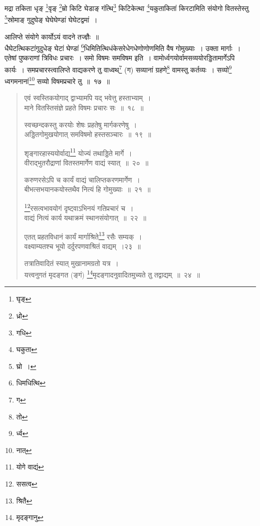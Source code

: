 \documentclass[11pt, openany]{book}
\begin{document}
{\qt मद्रा तकिता धृङ् \renewcommand{\thefootnote}{21}\footnote{घृङ्}वृङ् \renewcommand{\thefootnote}{22}\footnote{ध्रो}म्रो किटि घेडाङ् गंत्थि\renewcommand{\thefootnote}{23}\footnote{गधि} किटिकेत्था \renewcommand{\thefootnote}{24}\footnote{घकुता}यकुताकितां किरटामिति संयोगो वितस्तेस्तु \renewcommand{\thefootnote}{25}\footnote{घ्रो~।}स्रोमाङ् गुदुघेङ् घेघेघेण्डां घेघेटद्वमां~।}

\newpage

{\qt आलिप्ते संयोगे कार्योऽयं वादने तज्ज्ञैः~॥}\\

{\qt धैघेटत्थिकटांगुदुधेङ् घेटां घेण्डां \renewcommand{\thefootnote}{1}\footnote{धिमधित्थि}धिमितित्थिधंकेसरेधेगधेणोणोणमिति वैष गोमुख्याः~। उक्ता मार्गाः~।}\\

{\qt एतेषां पुष्कराणां त्रिविधः प्रचारः~। समो विषमः समविषम इति~। वामोर्ध्वगयोर्वामसव्ययोरड्डितामार्गेऽपि कार्यः~। समप्रचारस्त्वालिप्ते वाद्यकरणे तु वाध्वथ्\renewcommand{\thefootnote}{2}\footnote{ग} (ग) सव्यानां ग्रहणे\renewcommand{\thefootnote}{3}\footnote{तो} वामस्तु कर्तव्यः~। सव्यो\renewcommand{\thefootnote}{4}\footnote{र्ध्व} ध्वगमनानां\renewcommand{\thefootnote}{5}\footnote{नात्} सव्यो विषमप्रचारे तु~॥~१७~॥}

\begin{quote}
{\na  एवं स्वस्तिकयोगाद् द्वाभ्यामपि यद् भवेत्तु हस्ताभ्याम्~।\\
 माने वितस्तिसंज्ञे प्रहते विषमः प्रचारः सः~॥~१८~॥

 स्वच्छन्दकस्तु करयोः शेषः प्रहतेषु मार्गकरणेषु~।\\
 अड्डितगोमुखयोगात् समविषमो हस्तसञ्चारः~॥~१९~॥

 शृङ्गारहास्ययोर्वाद्य\renewcommand{\thefootnote}{6}\footnote{योगे वाद्यं} योज्यं तथाड्डिते मार्गे~।\\
 वीराद्भुतरौद्राणां वितस्तमार्गेण वाद्यं स्यात्~॥~२०~॥

 करुणरसेऽपि च कार्यं वाद्यं चालिप्तकरणमार्गेण~।\\
 बीभत्सभयानकयोस्तथैव नित्यं हि गोमुख्याः~॥~२१~॥

 \renewcommand{\thefootnote}{7}\footnote{ससत्व}रसत्वभावयोगं दृष्ट्वाऽभिनयं गतिप्रचारं च~।\\
 वाद्यं नित्यं कार्य यथाक्रमं स्थानसंयोगात्~॥~२२~॥

 एतत् प्रहतविधानं कार्यं मार्गाश्रिते\renewcommand{\thefootnote}{8}\footnote{श्रितै} रसैः सम्यक्~।\\
 वक्ष्याम्यतश्च भूयो दर्दुरपणवाश्रितं वाद्यम्~।२३~॥

 तत्रातिवादितं स्यात् मुखानामग्रतो यत्र~।\\
 यत्त्वनुगतं मृदङ्गत (ङ्गं) \renewcommand{\thefootnote}{9}\footnote{मृदङ्गानु}मृदङ्गादनुवादितमुच्यते तु तद्वाद्यम्~॥~२४~॥}
\end{quote}
\end{document}
